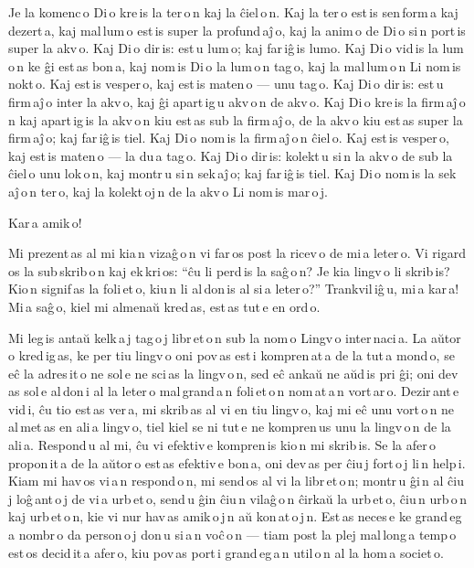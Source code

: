 \documentclass[12pt,twoside]{book}
\begin{document}
{}

Je la komenc\,o Di\,o kre\,is la ter\,o\,n kaj la ĉiel\,o\,n. Kaj la ter\,o est\,is sen\,form\,a kaj dezert\,a, kaj mal\,lum\,o est\,is super la profund\,aĵ\,o, kaj la anim\,o de Di\,o si\,n port\,is super la akv\,o. Kaj Di\,o dir\,is: est\,u lum\,o; kaj far\,iĝ\,is lumo. Kaj Di\,o vid\,is la lum\,o\,n ke ĝi est\,as bon\,a, kaj nom\,is Di\,o la lum\,o\,n tag\,o, kaj la mal\,lum\,o\,n Li nom\,is nokt\,o. Kaj est\,is vesper\,o, kaj est\,is maten\,o --- unu tag\,o. Kaj Di\,o dir\,is: est\,u firm\,aĵ\,o inter la akv\,o, kaj ĝi apart\,ig\,u akv\,o\,n de akv\,o. Kaj Di\,o kre\,is la firm\,aĵ\,o\,n kaj apart\,ig\,is la akv\,o\,n kiu est\,as sub la firm\,aĵ\,o, de la akv\,o kiu est\,as super la firm\,aĵ\,o; kaj far\,iĝ\,is tiel. Kaj Di\,o nom\,is la firm\,aĵ\,o\,n ĉiel\,o. Kaj est\,is vesper\,o, kaj est\,is maten\,o --- la du\,a tag\,o. Kaj Di\,o dir\,is: kolekt\,u si\,n la akv\,o de sub la ĉiel\,o unu lok\,o\,n, kaj montr\,u si\,n sek\,aĵ\,o; kaj far\,iĝ\,is tiel. Kaj Di\,o nom\,is la sek\,aĵ\,o\,n ter\,o, kaj la kolekt\,oj\,n de la akv\,o Li nom\,is mar\,o\,j.


{}

\hspace{5em} Kar\,a amik\,o!

Mi prezent\,as al mi kia\,n vizaĝ\,o\,n vi far\,os post la ricev\,o de mi\,a leter\,o. Vi rigard\,os la sub\,skrib\,o\,n kaj ek\,kri\,os: “ĉu li perd\,is la saĝ\,o\,n? Je kia lingv\,o li skrib\,is? Kio\,n signif\,as la foli\,et\,o, kiu\,n li al\,don\,is al si\,a leter\,o?” Trankvil\,iĝ\,u, mi\,a kar\,a! Mi\,a saĝ\,o, kiel mi almenaŭ kred\,as, est\,as tut\,e en ord\,o.

Mi leg\,is antaŭ kelk\,a\,j tag\,o\,j libr\,et\,o\,n sub la nom\,o \glqq{}Lingv\,o inter\,naci\,a\grqq{}. La aŭtor\,o kred\,ig\,as, ke per tiu lingv\,o oni pov\,as est\,i kompren\,at\,a de la tut\,a mond\,o, se eĉ la adres\,it\,o ne sol\,e ne sci\,as la lingv\,o\,n, sed eĉ ankaŭ ne aŭd\,is pri ĝi; oni dev\,as sol\,e al\,don\,i al la leter\,o mal\,grand\,a\,n foli\,et\,o\,n nom\,at\,a\,n \glqq{}vort\,ar\,o\grqq{}. Dezir\,ant\,e vid\,i, ĉu tio est\,as ver\,a, mi skrib\,as al vi en tiu lingv\,o, kaj mi eĉ unu vort\,o\,n ne al\,met\,as en ali\,a lingv\,o, tiel kiel se ni tut\,e ne kompren\,us unu la lingv\,o\,n de la ali\,a. Respond\,u al mi, ĉu vi efektiv\,e kompren\,is kio\,n mi skrib\,is. Se la afer\,o propon\,it\,a de la aŭtor\,o est\,as efektiv\,e bon\,a, oni dev\,as per ĉiu\,j fort\,o\,j li\,n help\,i. Kiam mi hav\,os vi\,a\,n respond\,o\,n, mi send\,os al vi la libr\,et\,o\,n; montr\,u ĝi\,n al ĉiu\,j loĝ\,ant\,o\,j de vi\,a urb\,et\,o, send\,u ĝin ĉiu\,n vilaĝ\,o\,n ĉirkaŭ la urb\,et\,o, ĉiu\,n urb\,o\,n kaj urb\,et\,o\,n, kie vi nur hav\,as amik\,o\,j\,n aŭ kon\,at\,o\,j\,n. Est\,as neces\,e ke grand\,eg\,a nombr\,o da person\,o\,j don\,u si\,a\,n voĉ\,o\,n --- tiam post la plej mal\,long\,a temp\,o est\,os decid\,it\,a afer\,o, kiu pov\,as port\,i grand\,eg\,a\,n util\,o\,n al la hom\,a societ\,o.
\end{document}
